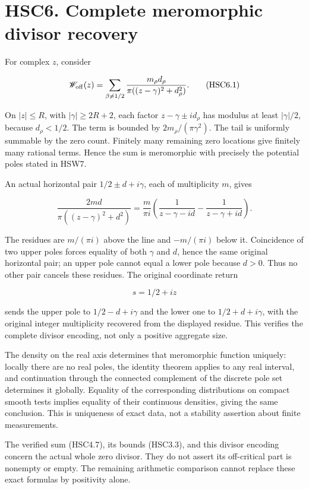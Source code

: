 \section{HSC6. Complete meromorphic divisor
recovery}\label{hsc6.-complete-meromorphic-divisor-recovery}

For complex \(z\), consider

\[
 \mathscr W_{\rm off}(z)=
 \sum_{\beta\ne1/2}\frac{m_\rho d_\rho}
 {\pi((z-\gamma)^2+d_\rho^2)}.
\tag{HSC6.1}
\]

On \(|z|\le R\), with \(|\gamma|\ge2R+2\), each factor
\(z-\gamma\pm i d_\rho\) has modulus at least \(|\gamma|/2\), because
\(d_\rho<1/2\). The term is bounded by \(2m_\rho/(\pi\gamma^2)\). The
tail is uniformly summable by the zero count. Finitely many remaining
zero locations give finitely many rational terms. Hence the sum is
meromorphic with precisely the potential poles stated in HSW7.

An actual horizontal pair \(1/2\pm d+i\gamma\), each of multiplicity
\(m\), gives

\[
 \frac{2md}{\pi((z-\gamma)^2+d^2)}
 =\frac{m}{\pi i}
 \left(\frac1{z-\gamma-id}-\frac1{z-\gamma+id}\right).
\tag{HSC6.2}
\]

The residues are \(m/(\pi i)\) above the line and \(-m/(\pi i)\) below
it. Coincidence of two upper poles forces equality of both \(\gamma\)
and \(d\), hence the same original horizontal pair; an upper pole cannot
equal a lower pole because \(d>0\). Thus no other pair cancels these
residues. The original coordinate return

\[
 s=1/2+iz
\]

sends the upper pole to \(1/2-d+i\gamma\) and the lower one to
\(1/2+d+i\gamma\), with the original integer multiplicity recovered from
the displayed residue. This verifies the complete divisor encoding, not
only a positive aggregate size.

The density on the real axis determines that meromorphic function
uniquely: locally there are no real poles, the identity theorem applies
to any real interval, and continuation through the connected complement
of the discrete pole set determines it globally. Equality of the
corresponding distributions on compact smooth tests implies equality of
their continuous densities, giving the same conclusion. This is
uniqueness of exact data, not a stability assertion about finite
measurements.

The verified sum (HSC4.7), its bounds (HSC3.3), and this divisor
encoding concern the actual whole zero divisor. They do not assert its
off-critical part is nonempty or empty. The remaining arithmetic
comparison cannot replace these exact formulas by positivity alone.

